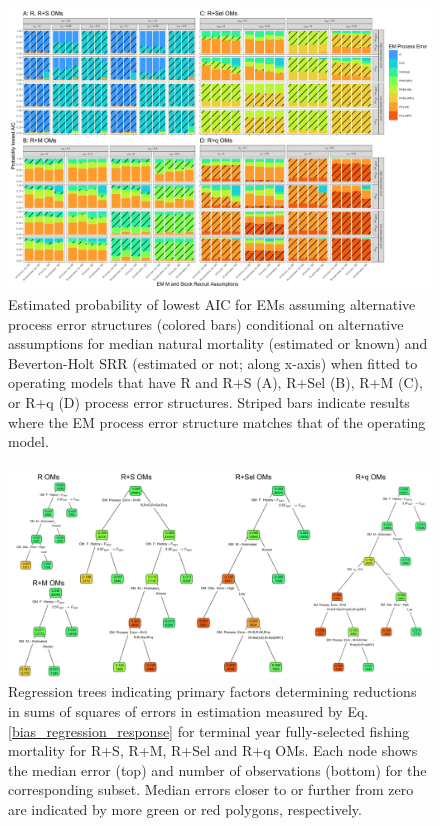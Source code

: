 \documentclass[
  12pt,
]{article}
\begin{document}
\begin{landscape}
\begin{figure}
\begin{center}
\includegraphics[width = 1.4\textwidth]{pe_aic_plots}
\end{center}
\caption{Estimated probability of lowest AIC for EMs assuming alternative process error structures (colored bars) conditional on alternative assumptions for median natural mortality (estimated or known) and Beverton-Holt SRR (estimated or not; along x-axis) when fitted to operating models that have R and R+S (A), R+Sel (B), R+M (C), or R+q (D) process error structures. Striped bars indicate results where the EM process error structure matches that of the operating model.}\label{pe_aic}
\end{figure}
\end{landscape}

\begin{landscape}
\begin{figure}
\begin{center}
\includegraphics[width = 1.4\textwidth]{F_bias_regtree_plots}
\end{center}
\caption{Regression trees indicating primary factors determining reductions in sums of squares of errors in estimation measured by Eq. \ref{bias_regression_response} for terminal year fully-selected fishing mortality for R+S, R+M, R+Sel and R+q OMs. Each node shows the median error (top) and number of observations (bottom) for the corresponding subset. Median errors closer to or further from zero are indicated by more green or red polygons, respectively.}\label{F_bias_regtree}
\end{figure}
\end{landscape}
\end{document}
